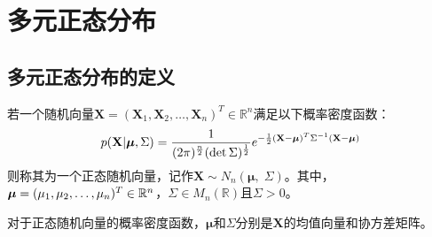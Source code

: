 \section{多元正态分布}

\subsection{多元正态分布的定义}
\begin{definition}\label{def:MultiNormal1}
	若一个随机向量$\mathbf{X}=(\mathbf{X}_1,\mathbf{X}_2,\dots,\mathbf{X}_n)^T\in\mathbb{R}^n$满足以下概率密度函数：
	\begin{equation}
		p(\mathbf{X}|\boldsymbol{\mu},\Sigma)=\frac{1}{(2\pi)^{\frac{n}{2}}(\det\Sigma)^{\frac{1}{2}}}e^{-\frac{1}{2}(\mathbf{X}-\boldsymbol{\mu})^T\Sigma^{-1}(\mathbf{X}-\boldsymbol{\mu})}\notag
	\end{equation}
	则称其为一个正态随机向量，记作$\mathbf{X}\sim N_n(\boldsymbol{\mu},\;\Sigma)$。其中，$\boldsymbol{\mu}=(\mu_1, \mu_2, \dots, \mu_{n})^T\in\mathbb{R}^{n}$，$\Sigma\in M_{n}(\mathbb{R})$且$\Sigma>0$。
\end{definition}
\begin{theorem}
	对于正态随机向量的概率密度函数，$\boldsymbol{\mu}$和$\Sigma$分别是$\mathbf{X}$的均值向量和协方差矩阵。
\end{theorem}
